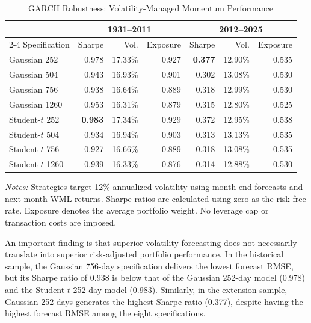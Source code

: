 \documentclass[11pt]{article}
\begin{document}
\begin{table}[htbp]
\centering
\caption{GARCH Robustness: Volatility-Managed Momentum Performance}
\label{tab:garch_robustness_performance}
\small
\begin{tabular}{lrrrrrr}
\hline
& \multicolumn{3}{c}{1931--2011}
& \multicolumn{3}{c}{2012--2025} \\
\cline{2-4}\cline{5-7}
Specification & Sharpe & Vol. & Exposure
              & Sharpe & Vol. & Exposure \\
\hline
Gaussian 252  & 0.978 & 17.33\% & 0.927
              & \textbf{0.377} & 12.90\% & 0.535 \\
Gaussian 504  & 0.943 & 16.93\% & 0.901
              & 0.302 & 13.08\% & 0.530 \\
Gaussian 756  & 0.938 & 16.64\% & 0.889
              & 0.318 & 12.99\% & 0.530 \\
Gaussian 1260 & 0.953 & 16.31\% & 0.879
              & 0.315 & 12.80\% & 0.525 \\
Student-$t$ 252  & \textbf{0.983} & 17.34\% & 0.929
                 & 0.372 & 12.95\% & 0.538 \\
Student-$t$ 504  & 0.934 & 16.94\% & 0.903
                 & 0.313 & 13.13\% & 0.535 \\
Student-$t$ 756  & 0.927 & 16.66\% & 0.889
                 & 0.318 & 13.08\% & 0.535 \\
Student-$t$ 1260 & 0.939 & 16.33\% & 0.876
                 & 0.314 & 12.88\% & 0.530 \\
\hline
\end{tabular}
\begin{flushleft}
\footnotesize
\textit{Notes:} Strategies target 12\% annualized volatility
using month-end forecasts and next-month WML returns.
Sharpe ratios are calculated using zero as the risk-free rate.
Exposure denotes the average portfolio weight. No leverage
cap or transaction costs are imposed.
\end{flushleft}
\end{table}

An important finding is that superior volatility forecasting does
not necessarily translate into superior risk-adjusted portfolio
performance. In the historical sample, the Gaussian 756-day
specification delivers the lowest forecast RMSE, but its Sharpe
ratio of 0.938 is below that of the Gaussian 252-day model (0.978)
and the Student-$t$ 252-day model (0.983). Similarly, in the
extension sample, Gaussian 252 days generates the highest Sharpe
ratio (0.377), despite having the highest forecast RMSE among
the eight specifications.
\end{document}
